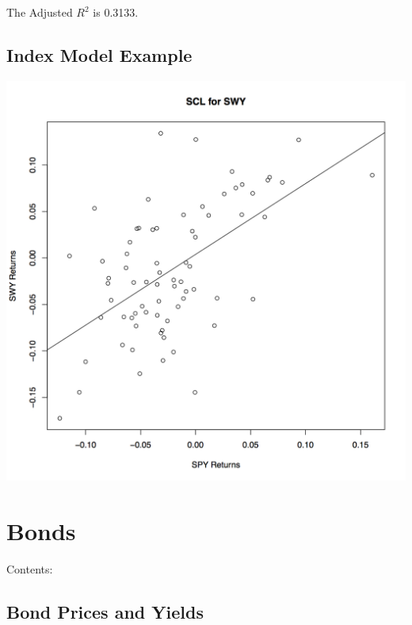 \documentclass[letterpaper,10pt,english]{sphinxmanual}
\begin{document}
The Adjusted $R^2$ is 0.3133.


\section{Index Model Example}
\label{indexModels:id15}
\includegraphics[width=6in]{spy-swy-reg.png}


\chapter{Bonds}
\label{bonds::doc}\label{bonds:bonds}
Contents:


\section{Bond Prices and Yields}
\label{bondPrices:bond-prices-and-yields}\label{bondPrices::doc}
\end{document}
